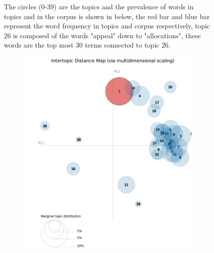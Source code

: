 \begin{figure}[h!]
\begin{subfigure}[h]{0.60\textwidth}
        \label{fig:trapez2}
    \end{subfigure}
    \caption{The circles (0-39) are the topics and the prevalence of words in topics and in the corpus is shown in below, the red bar and blue bar represent the word frequency in topics and corpus respectively, topic 26 is composed of the words "appeal" down to "allocations", these words are the top most 30 terms connected to topic 26.}\label{figure 4.5}
\end{figure}
\newpage
\begin{figure}[h!]
    \centering
    \begin{subfigure}[h]{0.60\textwidth}
        \includegraphics[width=\textwidth]{c4_7.png}
        \label{fig:trapez1}
    \end{subfigure}
    ~ %
    \begin{subfigure}[h]{0.60\textwidth}

\end{subfigure}
\end{figure}
